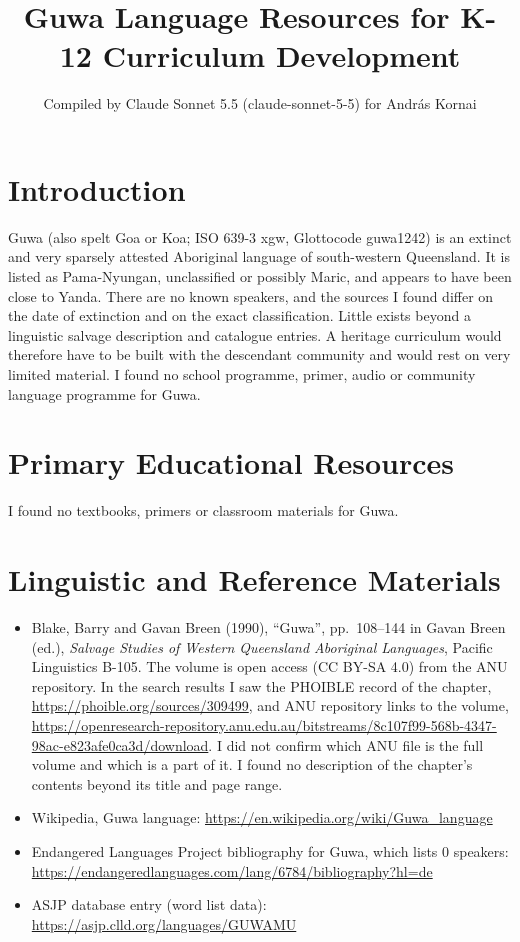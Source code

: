 \documentclass[12pt]{article}
\title{Guwa Language Resources for K-12 Curriculum Development}
\author{Compiled by Claude Sonnet 5.5 (claude-sonnet-5-5) for Andr\'as Kornai}
\date{}
\begin{document}
\maketitle

\section{Introduction}
Guwa (also spelt Goa or Koa; ISO 639-3 xgw, Glottocode guwa1242) is an extinct and very sparsely attested Aboriginal language of south-western Queensland. It is listed as Pama-Nyungan, unclassified or possibly Maric, and appears to have been close to Yanda. There are no known speakers, and the sources I found differ on the date of extinction and on the exact classification. Little exists beyond a linguistic salvage description and catalogue entries. A heritage curriculum would therefore have to be built with the descendant community and would rest on very limited material. I found no school programme, primer, audio or community language programme for Guwa.

\section{Primary Educational Resources}
I found no textbooks, primers or classroom materials for Guwa.

\section{Linguistic and Reference Materials}
\begin{itemize}
\item Blake, Barry and Gavan Breen (1990), ``Guwa'', pp.\ 108--144 in Gavan Breen (ed.), \emph{Salvage Studies of Western Queensland Aboriginal Languages}, Pacific Linguistics B-105. The volume is open access (CC BY-SA 4.0) from the ANU repository. In the search results I saw the PHOIBLE record of the chapter, \url{https://phoible.org/sources/309499}, and ANU repository links to the volume, \url{https://openresearch-repository.anu.edu.au/bitstreams/8c107f99-568b-4347-98ac-e823afe0ca3d/download}. I did not confirm which ANU file is the full volume and which is a part of it. I found no description of the chapter's contents beyond its title and page range.
\item Wikipedia, Guwa language: \url{https://en.wikipedia.org/wiki/Guwa_language}
\item Endangered Languages Project bibliography for Guwa, which lists 0 speakers: \url{https://endangeredlanguages.com/lang/6784/bibliography?hl=de}
\item ASJP database entry (word list data): \url{https://asjp.clld.org/languages/GUWAMU}
\end{itemize}
\end{document}
